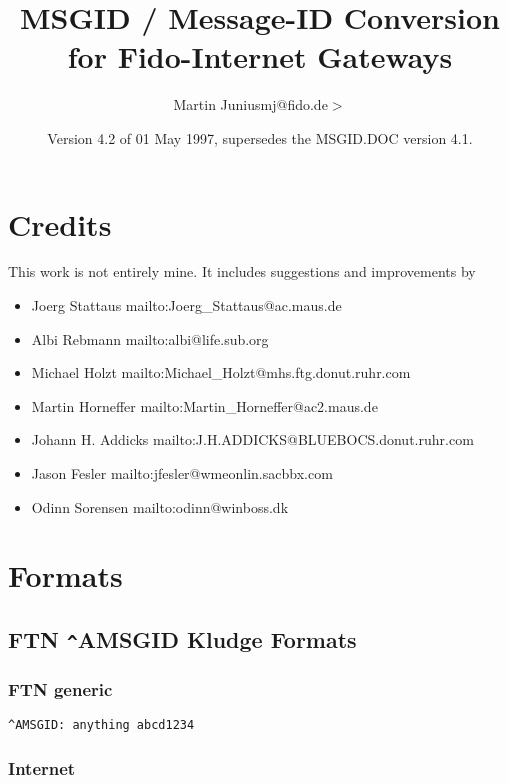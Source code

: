 \documentclass{article}
\title{MSGID / Message-ID Conversion for Fido-Internet Gateways }
\author{Martin Junius{\ttfamily  {\(<\)}mj@fido.de{\(>\)}} }
\date{Version 4.2 of 01 May 1997, supersedes the MSGID.DOC version 4.1.}
\begin{document}
\maketitle

\section{Credits }



This work is not entirely mine. It includes suggestions and improvements by 
\begin{itemize}
\item Joerg Stattaus 
mailto:Joerg\_Stattaus@ac.maus.de 
\item Albi Rebmann 
mailto:albi@life.sub.org 
\item Michael Holzt 
mailto:Michael\_Holzt@mhs.ftg.donut.ruhr.com 
\item Martin Horneffer 
mailto:Martin\_Horneffer@ac2.maus.de 
\item Johann H. Addicks 
mailto:J.H.ADDICKS@BLUEBOCS.donut.ruhr.com 
\item Jason Fesler 
mailto:jfesler@wmeonlin.sacbbx.com 
\item Odinn Sorensen 
mailto:odinn@winboss.dk  
\end{itemize}



\section{Formats }




\subsection{FTN \verb+^+AMSGID Kludge Formats }




\subsubsection{FTN generic }

\begin{verbatim}
^AMSGID: anything abcd1234 
\end{verbatim}



\subsubsection{Internet }
\end{document}
